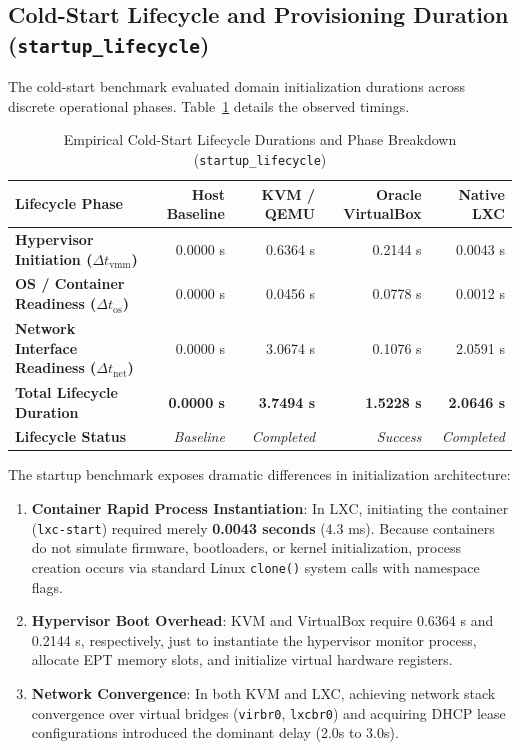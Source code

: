 \subsection{Cold-Start Lifecycle and Provisioning Duration (\texttt{startup\_lifecycle})}
\label{subsec:results_startup}

The cold-start benchmark evaluated domain initialization durations across discrete operational phases. Table~\ref{tab:results_startup} details the observed timings.

\begin{table}[t]
\centering
\small
\caption{Empirical Cold-Start Lifecycle Durations and Phase Breakdown (\texttt{startup\_lifecycle})}
\label{tab:results_startup}
\setlength{\tabcolsep}{3.5pt}
\begin{tabular*}{\textwidth}{@{\extracolsep{\fill}}lrrrr}
\toprule
\textbf{Lifecycle Phase} & \textbf{Host Baseline} & \textbf{KVM / QEMU} & \textbf{Oracle VirtualBox} & \textbf{Native LXC} \\
\midrule
\textbf{Hypervisor Initiation ($\Delta t_{\text{vmm}}$)} & 0.0000 s & 0.6364 s & 0.2144 s & 0.0043 s \\
\textbf{OS / Container Readiness ($\Delta t_{\text{os}}$)} & 0.0000 s & 0.0456 s & 0.0778 s & 0.0012 s \\
\textbf{Network Interface Readiness ($\Delta t_{\text{net}}$)} & 0.0000 s & 3.0674 s & 0.1076 s & 2.0591 s \\
\textbf{Total Lifecycle Duration} & \textbf{0.0000 s} & \textbf{3.7494 s} & \textbf{1.5228 s} & \textbf{2.0646 s} \\
\textbf{Lifecycle Status} & \textit{Baseline} & \textit{Completed} & \textit{Success} & \textit{Completed} \\
\bottomrule
\end{tabular*}
\end{table}

The startup benchmark exposes dramatic differences in initialization architecture:
\begin{enumerate}
    \item \textbf{Container Rapid Process Instantiation}: In LXC, initiating the container (\texttt{lxc-start}) required merely \textbf{0.0043 seconds} (4.3 ms). Because containers do not simulate firmware, bootloaders, or kernel initialization, process creation occurs via standard Linux \texttt{clone()} system calls with namespace flags.
    \item \textbf{Hypervisor Boot Overhead}: KVM and VirtualBox require 0.6364 s and 0.2144 s, respectively, just to instantiate the hypervisor monitor process, allocate EPT memory slots, and initialize virtual hardware registers.
    \item \textbf{Network Convergence}: In both KVM and LXC, achieving network stack convergence over virtual bridges (\texttt{virbr0}, \texttt{lxcbr0}) and acquiring DHCP lease configurations introduced the dominant delay (2.0s to 3.0s).
\end{enumerate}

